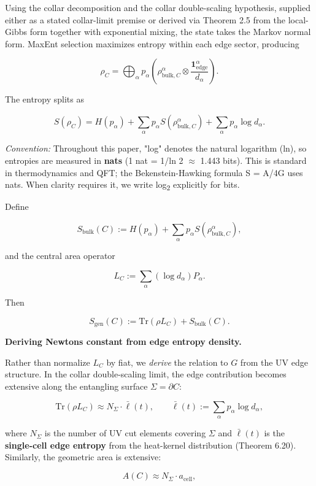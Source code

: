 Using the collar decomposition and the collar double-scaling hypothesis, supplied either as a stated collar-limit premise or derived via Theorem 2.5 from the local-Gibbs form together with exponential mixing, the state takes the Markov normal form. MaxEnt selection maximizes entropy within each edge sector, producing

\[
\rho_C = \bigoplus_{\alpha} p_{\alpha}
\left(\rho_{\mathrm{bulk},C}^{\alpha} \otimes \frac{\mathbf 1_{\mathrm{edge}}^{\alpha}}{d_{\alpha}}\right).
\]

The entropy splits as

\[
S(\rho_C) = H(p_{\alpha}) + \sum_{\alpha} p_{\alpha} S(\rho_{\mathrm{bulk},C}^{\alpha}) + \sum_{\alpha} p_{\alpha} \log d_{\alpha}.
\]

\emph{Convention:} Throughout this paper, "log" denotes the natural logarithm (ln), so entropies are measured in \textbf{nats} (1 nat = 1/ln 2 \ensuremath{\approx} 1.443 bits). This is standard in thermodynamics and QFT; the Bekenstein-Hawking formula S = A/4G uses nats. When clarity requires it, we write log\textsubscript{2} explicitly for bits.

Define

\[
S_{\mathrm{bulk}}(C) := H(p_{\alpha}) + \sum_{\alpha} p_{\alpha} S(\rho_{\mathrm{bulk},C}^{\alpha}),
\]

and the central area operator

\[
L_C := \sum_{\alpha} (\log d_{\alpha}) P_{\alpha}.
\]

Then

\[
S_{\mathrm{gen}}(C) := \mathrm{Tr}(\rho L_C) + S_{\mathrm{bulk}}(C).
\]

\textbf{Deriving Newton\textquotesingle s constant from edge entropy density.}

Rather than normalize \(L_C\) by fiat, we \emph{derive} the relation to \(G\) from the UV edge structure. In the collar double-scaling limit, the edge contribution becomes extensive along the entangling surface \(\Sigma = \partial C\):

\[
\mathrm{Tr}(\rho L_C) \approx N_\Sigma \cdot \bar{\ell}(t),
\qquad
\bar{\ell}(t) := \sum_\alpha p_\alpha \log d_\alpha,
\]

where \(N_\Sigma\) is the number of UV cut elements covering \(\Sigma\) and \(\bar{\ell}(t)\) is the \textbf{single-cell edge entropy} from the heat-kernel distribution (Theorem 6.20). Similarly, the geometric area is extensive:

\[
A(C) \approx N_\Sigma \cdot a_{\mathrm{cell}},
\]

